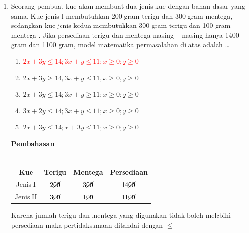 \documentclass{report}
\newcommand{\options}[5]{
\begin{enumerate}[label=\alph*.]
	\item #1
	\item #2
	\item #3
	\item #4
	\item #5
\end{enumerate}
}
\newcommand{\pemb}{ \textbf{Pembahasan} \\}
\begin{document}
\begin{enumerate}
\item Seorang pembuat kue akan membuat dua jenis kue dengan bahan dasar yang sama. Kue
jenis I membutuhkan 200 gram terigu dan 300 gram mentega, sedangkan kue jenis
kedua membutuhkan 300 gram terigu dan 100 gram mentega . Jika persediaan terigu dan
mentega masing – masing hanya 1400 gram dan 1100 gram, model matematika
permasalahan di atas adalah \ldots
\options
{\textcolor{red}{$2x+3y\leq14;3x+y\leq11;x\geq0;y\geq0$}}
{$2x+3y\geq14;3x+y\leq11;x\geq0;y\geq0$}
{$2x+3y\leq14;3x+y\geq11;x\geq0;y\geq0$}
{$3x+2y\leq14;3x+y\leq11;x\geq0;y\geq0$}
{$2x+3y\leq14;x+3y\leq11;x\geq0;y\geq0$}
\pemb
\\
\begin{center}
\begin{tabular}{|c|c|c|c|}
	\hline
	Kue & Terigu & Mentega & Persediaan \\
	\hline
	Jenis I & $2\cancel{00}$ & $3\cancel{00}$ & $14\cancel{00}$ \\
	\hline
	Jenis II & $3\cancel{00}$ & $1\cancel{00}$ & $11\cancel{00}$ \\
	\hline
\end{tabular}
\end{center}
Karena jumlah terigu dan mentega yang digunakan tidak boleh melebihi persediaan maka pertidaksamaan ditandai dengan $\leq$


\end{enumerate}
\end{document}
